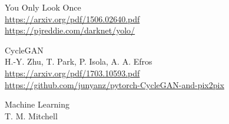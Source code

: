 \documentclass{article}
\begin{document}
\begin{thebibliography}{1}
        You Only Look Once
        \\
        \url{https://arxiv.org/pdf/1506.02640.pdf}
        \\
        \url{https://pjreddie.com/darknet/yolo/}
    
        CycleGAN
        \\
        H.-Y. Zhu, T. Park, P. Isola, A. A. Efros
        \\
        \url{https://arxiv.org/pdf/1703.10593.pdf}
        \\
        \url{https://github.com/junyanz/pytorch-CycleGAN-and-pix2pix}

    Machine Learning
    \\
    T. M. Mitchell
    \\
    \\ 

\end{thebibliography}
\end{document}
